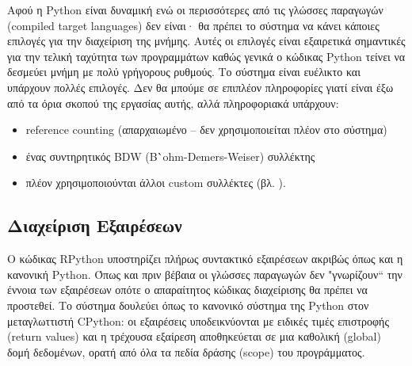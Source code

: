 Αφού η Python είναι δυναμική ενώ οι περισσότερες από τις γλώσσες παραγωγών
(compiled target languages) δεν είναι· θα πρέπει το σύστημα να κάνει κάποιες
επιλογές για την διαχείριση της μνήμης. Αυτές οι επιλογές είναι εξαιρετικά
σημαντικές για την τελική ταχύτητα των προγραμμάτων καθώς γενικά ο κώδικας
Python τείνει να δεσμεύει μνήμη με πολύ γρήγορους ρυθμούς. Το σύστημα είναι
ευέλικτο και υπάρχουν πολλές επιλογές. Δεν θα μπούμε σε επιπλέον πληροφορίες
γιατί είναι έξω από τα όρια σκοπού της εργασίας αυτής, αλλά πληροφοριακά
υπάρχουν:

\begin{itemize}
\item reference counting (απαρχαιωμένο – δεν χρησιμοποιείται πλέον στο σύστημα)
\item ένας συντηρητικός BDW (B\``ohm-Demers-Weiser) συλλέκτης\cite{bdw}
\item πλέον χρησιμοποιούνται άλλοι custom συλλέκτες (βλ. \cite{gc}).
\end{itemize}

\subsection{Διαχείριση Εξαιρέσεων}

Ο κώδικας RPython υποστηρίζει πλήρως συντακτικό εξαιρέσεων ακριβώς όπως και η
κανονική Python. Όπως και πριν βέβαια οι γλώσσες παραγωγών δεν "γνωρίζουν`` την
έννοια των εξαιρέσεων οπότε ο απαραίτητος κώδικας διαχείρισης θα πρέπει να
προστεθεί. Το σύστημα δουλεύει όπως το κανονικό σύστημα της Python στον
μεταγλωττιστή CPython: οι εξαιρέσεις υποδεικνύονται με ειδικές τιμές επιστροφής
(return values) και η τρέχουσα εξαίρεση αποθηκεύεται σε μια καθολική (global)
δομή δεδομένων, ορατή από όλα τα πεδία δράσης (scope) του προγράμματος.

